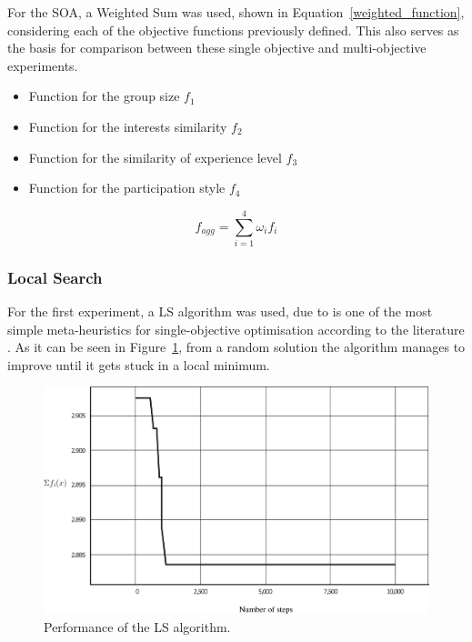 For the SOA, a Weighted Sum was used, shown in Equation~\ref{weighted_function}, considering each of the objective functions previously defined. This also serves as the basis for comparison between these single objective and multi-objective experiments.\\

\begin{itemize}
\item Function for the group size \(f_{1}\)
\item Function for the interests similarity \(f_{2}\)
\item Function for the similarity of experience level \(f_{3}\)
\item Function for the participation style \(f_{4}\)
\end{itemize}

\begin{equation} \label{weighted_function}
    f_{agg} = \sum_{i=1}^4 \omega_i f_i
\end{equation}

\subsubsection{Local Search}

For the first experiment, a LS algorithm was used, due to is one of the most simple meta-heuristics for single-objective optimisation according to the literature \cite{boussaid2013survey}. As it can be seen in Figure~\ref{fig:local_search}, from a random solution the algorithm manages to improve until it gets stuck in a local minimum.\\

\begin{figure}
    \centering
    \includegraphics[width=\textwidth]{images/local_search.png}
    \caption{Performance of the LS algorithm.}
    \label{fig:local_search}
\end{figure}

